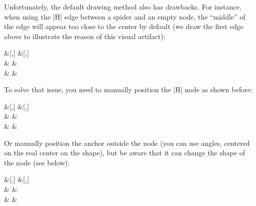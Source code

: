 \documentclass[a4paper,doc2]{ltxdoc} %
\begin{document}
Unfortunately, the default drawing method also has drawbacks. For instance, when using the |H| edge between a spider and an empty node, the ``middle'' of the edge will appear too close to the center by default (we draw the first edge above to illustrate the reason of this visual artifact):
\begin{codeexample}[width=0cm]
\begin{ZX}
 \zxN{}  &[\zxwCol,\zxHCol]  &[\zxwCol,\zxHCol] \zxN{} \\[\zxNRow]%
                                 & \zxX{\alpha}
                                   \ar[ru,N'-,H]
                                   \ar[rd,N.-,H] &  \\[\zxNRow]
 \zxN{} \ar[ru,-N',H]                        &  & \zxN{}
\end{ZX}
\end{codeexample}
To solve that issue, you need to manually position the |H| node as shown before:
\begin{codeexample}[width=0cm]
\begin{ZX}
 \zxN{} \ar[rd,edge above,-N.,H={pos=.35}] &[\zxwCol,\zxHCol]  &[\zxwCol,\zxHCol] \zxN{} \\[\zxNRow]%
                                           & \zxX{\alpha}
                                             \ar[ru,N'-,H={pos=1-.35}]
                                             \ar[rd,N.-,H={pos=1-.35}] &  \\[\zxNRow]
 \zxN{} \ar[ru,-N',H={pos=.35}]                                  &  & \zxN{}
\end{ZX}
\end{codeexample}
Or manually position the anchor outside the node (you can use angles, centered on the real center on the shape), but be aware that it can change the shape of the node (see below):
\begin{codeexample}[width=0cm]
\begin{ZX}
 \zxN{} \ar[rd,edge above,-N.,H,end anchor=180-45] &[\zxwCol,\zxHCol]  &[\zxwCol,\zxHCol] \zxN{} \\[\zxNRow]%
                                           & \zxX{\alpha}
                                             \ar[ru,N'-,H,start anchor=45]
                                             \ar[rd,N.-,H,start anchor=-45] &  \\[\zxNRow]
 \zxN{} \ar[ru,-N',H,end anchor=180+45]                                  &  & \zxN{}
\end{ZX}
\end{codeexample}
\end{document}
